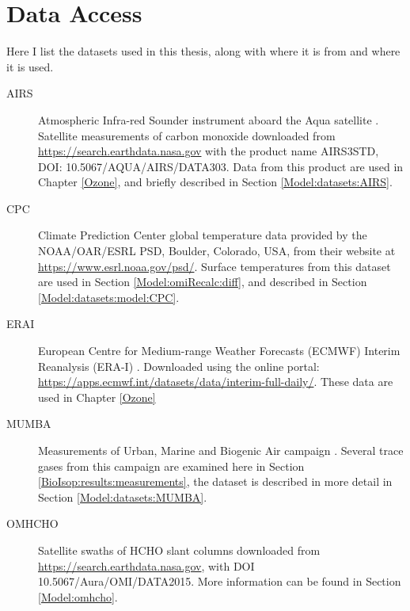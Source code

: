      
\section{Data Access}
  \label{Model:DataAccess}
  
  Here I list the datasets used in this thesis, along with where it is from and where it is used.
  
  \begin{description}
    \item[AIRS] Atmospheric Infra-red Sounder instrument aboard the Aqua satellite \parencite{AIRS3STD}.
    Satellite measurements of carbon monoxide downloaded from \url{https://search.earthdata.nasa.gov} with the product name AIRS3STD, DOI: 10.5067/AQUA/AIRS/DATA303.
    Data from this product are used in Chapter \ref{Ozone}, and briefly described in Section \ref{Model:datasets:AIRS}.
    
    \item[CPC] Climate Prediction Center global temperature data provided by the NOAA/OAR/ESRL PSD, Boulder, Colorado, USA, from their website at \url{https://www.esrl.noaa.gov/psd/}.
    Surface temperatures from this dataset are used in Section \ref{Model:omiRecalc:diff}, and described in Section \ref{Model:datasets:model:CPC}.
    
    \item[ERAI] European Centre for Medium-range Weather Forecasts (ECMWF) Interim Reanalysis (ERA-I) \parencite{Dee2011}. 
    Downloaded using the online portal: \url{https://apps.ecmwf.int/datasets/data/interim-full-daily/}.
    These data are used in Chapter \ref{Ozone}
    
    \item[MUMBA] Measurements of Urban, Marine and Biogenic Air campaign \parencite{PatonWalsh2017}.
    Several trace gases from this campaign are examined here in Section \ref{BioIsop:results:measurements}, the dataset is described in more detail in Section \ref{Model:datasets:MUMBA}.
    
    
    \item[OMHCHO] Satellite swaths of HCHO slant columns downloaded from \url{https://search.earthdata.nasa.gov}, with DOI 10.5067/Aura/OMI/DATA2015.
    More information can be found in Section \ref{Model:omhcho}.
    

\end{description}
